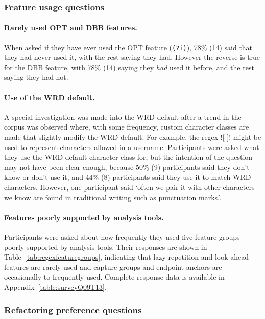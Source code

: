 

\subsubsection{Feature usage questions}

\paragraph{Rarely used OPT and DBB features.}  When asked if they have ever used the OPT feature (\verb!(?i)!), 78\% (14) said that they had never used it, with the rest saying they had.  However the reverse is true for the DBB feature, with 78\% (14) saying they \emph{had} used it before, and the rest saying they had not.

\paragraph{Use of the WRD default.}  A special investigation was made into the WRD default after a trend in the corpus was observed where, with some frequency, custom character classes are made that slightly modify the WRD default.  For example, the regex \cverb![\w-]! might be used to represent characters allowed in a username.
Participants were asked what they use the WRD default character class for, but the intention of the question may not have been clear enough, because 50\% (9) participants said they don't know or don't use it, and 44\% (8) participants said they use it to match WRD characters.  However, one participant said `often we pair it with other characters we know are found in traditional writing such as punctuation marks.'.

\paragraph{Features poorly supported by analysis tools.} Participants were asked about how frequently they used five feature groups poorly supported by analysis tools.  Their responses are shown in Table~\ref{tab:regexfeaturegroups}, indicating that lazy repetition and look-ahead features are rarely used and capture groups and endpoint anchors are occasionally to frequently used. Complete response data is available in Appendix~\ref{table:surveyQ09T13}.



\subsubsection{Refactoring preference questions}
